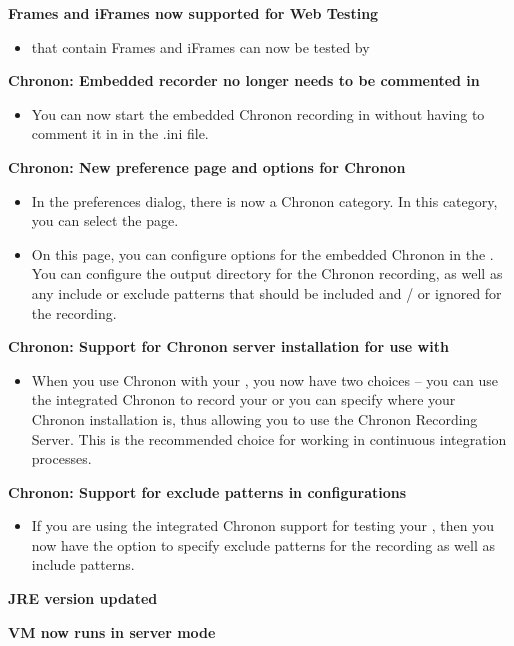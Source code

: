 \textbf{Frames and iFrames now supported for Web Testing}
\begin{itemize}
\item \gdauts{} that contain Frames and iFrames can now be tested by \app{}
\end{itemize}

\textbf{Chronon: Embedded recorder no longer needs to be commented in}
\begin{itemize}
\item You can now start the embedded Chronon recording in \app{} without having to comment it in in the .ini file. 
\end{itemize}

\textbf{Chronon: New preference page and options for \ite{} Chronon}
\begin{itemize}
\item In the preferences dialog, there is now a Chronon category. In this category, you can select the  page. 
\item On this page, you can configure options for the embedded Chronon in the \ite{}. You can configure the output directory for the Chronon recording, as well as any include or exclude patterns that should be included and / or ignored for the recording.  
\end{itemize}

\textbf{Chronon: Support for Chronon server installation for use with \gdauts{}}
\begin{itemize}
\item When you use Chronon with your \gdaut{}, you now have two choices -- you can use the integrated Chronon to record your \gdaut{} or you can specify where your Chronon installation is, thus allowing you to use the Chronon Recording Server. This is the recommended choice for working in continuous integration processes.   
\end{itemize}

\textbf{Chronon: Support for exclude patterns in \gdaut{} configurations}
\begin{itemize}
\item If you are using the integrated Chronon support for testing your \gdaut{}, then you now have the option to specify exclude patterns for the recording as well as include patterns. 
\end{itemize}

\textbf{JRE version updated}

\textbf{VM now runs in server mode}

